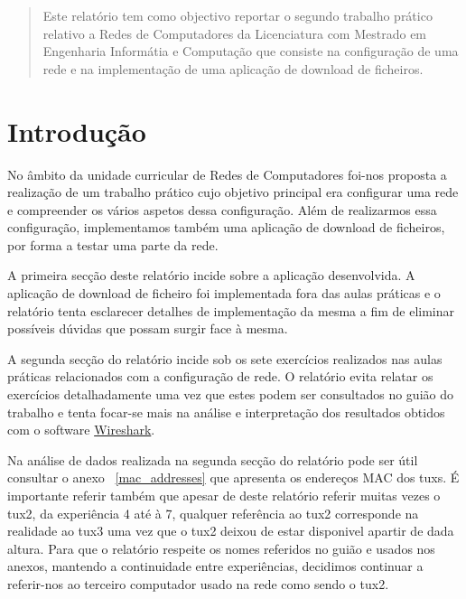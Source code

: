 \documentclass[11pt,a4paper,reqno]{report}
\numberwithin{equation}{section}
\begin{document}



\begin{abstract}
	
Este relatório tem como objectivo reportar o segundo trabalho prático relativo a Redes de Computadores da Licenciatura com Mestrado em Engenharia Informátia e Computação que consiste na configuração de uma rede e na implementação de uma aplicação de download de ficheiros.


\end{abstract}

\tableofcontents

\chapter{Introdução}

No âmbito da unidade curricular de Redes de Computadores foi-nos proposta a realização de um trabalho prático cujo objetivo principal era configurar uma rede e compreender os vários aspetos dessa configuração. Além de realizarmos essa configuração, implementamos também uma aplicação de download de ficheiros, por forma a testar uma parte da rede.

A primeira secção deste relatório incide sobre a aplicação desenvolvida. A aplicação de download de ficheiro foi implementada fora das aulas práticas e o relatório tenta esclarecer detalhes de implementação da mesma a fim de eliminar possíveis dúvidas que possam surgir face à mesma.

A segunda secção do relatório incide sob os sete exercícios realizados nas aulas práticas relacionados com a configuração de rede. O relatório evita relatar os exercícios detalhadamente uma vez que estes podem ser consultados no guião do trabalho e tenta focar-se mais na análise e interpretação dos resultados obtidos com o software \href{https://www.wireshark.org/}{Wireshark}.

Na análise de dados realizada na segunda secção do relatório pode ser útil consultar o anexo ~\ref{mac_addresses} que apresenta os endereços MAC dos tuxs. É importante referir também que apesar de deste relatório referir muitas vezes o tux2, da experiência 4 até à 7, qualquer referência ao tux2 corresponde na realidade ao tux3 uma vez que o tux2 deixou de estar disponivel apartir de dada altura. Para que o relatório respeite os nomes referidos no guião e usados nos anexos, mantendo a continuidade entre experiências, decidimos continuar a referir-nos ao terceiro computador usado na rede como sendo o tux2.  
	
\end{document}
